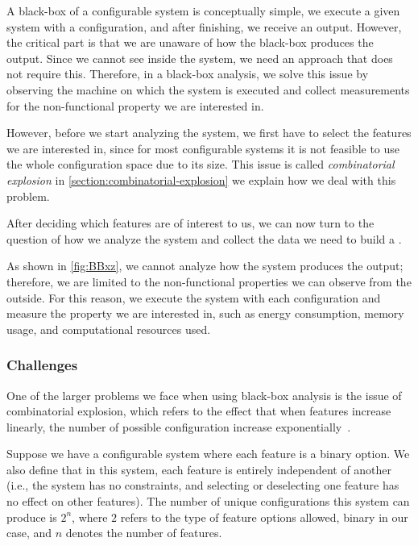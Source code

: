 A black-box of a configurable system is conceptually simple, we execute a given system with a configuration, and after finishing, we receive an output. 
However, the critical part is that we are unaware of how the black-box produces the output. 
Since we cannot see inside the system, we need an approach that does not require this. 
Therefore, in a black-box analysis, we solve this issue by observing the machine on which the system is executed and 
collect measurements for the non-functional property we are interested in.

However, before we start analyzing the system, we first have to select the features we are interested in, since for most configurable systems it is 
not feasible to use the whole configuration space due to its size. This issue is called \emph{combinatorial explosion} in \autoref{section:combinatorial-explosion}
we explain how we deal with this problem.

After deciding which features are of interest to us, we can now turn to the question 
of how we analyze the system and collect the data we need to build a {\perfInfluenceModel}.

As shown in \autoref{fig:BBxz}, we cannot analyze how the system produces the output; 
therefore, we are limited to the non-functional properties we can observe from the outside. For this reason, 
we execute the system with each configuration and measure the property we are interested in, such as energy consumption, memory usage, 
and computational resources used.  

\subsubsection{Challenges}\label{section:combinatorial-explosion}
One of the larger problems we face when using black-box analysis is the issue of combinatorial explosion, 
which refers to the effect that when features increase linearly, the number of possible configuration
increase exponentially~\cite{Combinatorial-explosion}.

Suppose we have a configurable system where each feature is a binary option.
We also define that in this system, each feature is entirely independent of another
(i.e., the system has no constraints, and selecting or deselecting one feature has no effect on other features).
The number of unique configurations this system can produce is $2^n$, where $2$ refers to the type of feature options allowed,
binary in our case, and $n$ denotes the number of features. 

